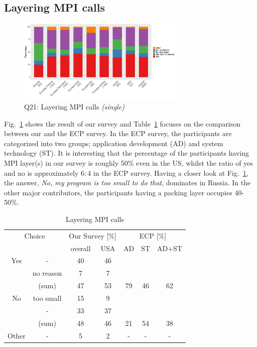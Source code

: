 \documentclass[preprint,5p,times]{elsarticle}
\def\myquote#1{{\it #1}}
\def\mcountries{major contributors\xspace{}}%
\begin{document}
\subsection{Layering MPI calls}\label{sec:mpi-calls}

\begin{figure}[tb]
  \begin{center}
    \includegraphics[width=8.0cm]{R-scripts/Q21.pdf}
    \vspace{-2mm}
    \caption{Q21: Layering MPI calls {\it(single)}}
    \label{fig:layering-mpi-calls}
  \end{center}
\end{figure}

Fig.~\ref{fig:layering-mpi-calls} shows the result of our survey and
Table~\ref{tab:layering-mpi-calls} focuses on the comparison between our
and the ECP survey. In the ECP survey, the participants are categorized
into two groups; application development (AD) and system technology
(ST). It is interesting that the percentage of the participants having
MPI layer(s) in our survey is roughly 50\% even in the US, whilst the
ratio of yes and no is approximately $6:4$ in the ECP survey.
Having a closer look at Fig.~\ref{fig:layering-mpi-calls}, the answer,
\myquote{No, my program is too small to do that}, dominates in Russia. In
the other \mcountries, the participants having a packing layer occupies
40-50\%.

\begin{table}[tb]%
  \small%
  \begin{center}%
    \caption{Layering MPI calls}\label{tab:layering-mpi-calls}%
    \begin{tabular}{c|c||c|c||c|c|c}%
      \hline%
      \multicolumn{2}{c||}{Choice} & \multicolumn{2}{c||}{Our Survey [\%]} &
      \multicolumn{3}{c}{ECP [\%]} \\
      \cline{3-7}%
      \multicolumn{2}{c||}{} & overall & USA & AD & ST & AD+ST \\
      \hline%
      \hline%
      Yes & - & 40 & 46 & & & \\
      & no reason & 7 & 7 & & & \\
      \cline{2-4}%
      & (sum) & 47 & 53 &  79 & 46 & 62 \\
      \hline%
      \hline%
      No & too small & 15 & 9 & & & \\
      & - & 33 & 37 & & & \\
      \cline{2-4}%
      & (sum) & 48 & 46 & 21 & 54 & 38 \\
      \hline%
      \hline%
      Other & - & 5 & 2 & - & - & - \\
      \hline%
    \end{tabular}%
  \end{center}%
\end{table}%
\end{document}

